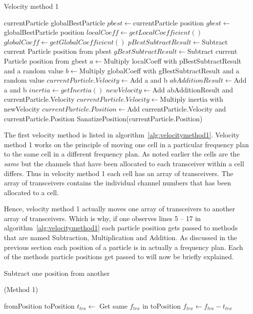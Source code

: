 \begin{algorithm}
\caption{Velocity method 1}
\label{alg:velocitymethod1}
	\begin{algorithmic}[1]
	\REQUIRE currentParticle
	\REQUIRE globalBestParticle
	\STATE $pbest \leftarrow $currentParticle position
	\STATE $gbest \leftarrow $globalBestParticle position
	\STATE $localCoeff \leftarrow getLocalCoefficient()$
	\STATE $globalCoeff \leftarrow getGlobalCoefficient()$
	\STATE $pBestSubtractResult \leftarrow $Subtract current Particle position from pbest
	\STATE $gBestSubtractResult \leftarrow $Subtract current Particle position from gbest
	\STATE $a \leftarrow $Multiply localCoeff with pBestSubtractResult and a random value
	\STATE $b \leftarrow $Multiply globalCoeff with gBestSubtractResult and a random value
		\STATE $currentParticle.Velocity \leftarrow $Add a and b
	\ELSE
		\STATE $abAdditionResult \leftarrow $Add a and b
		\STATE $inertia \leftarrow getInertia()$
		\STATE $newVelocity \leftarrow $Add abAdditionResult and currentParticle.Velocity
		\STATE $currentParticle.Velocity \leftarrow $Multiply inertia with newVelocity
	\ENDIF
	\STATE $currentParticle.Position \leftarrow $Add currentParticle.Velocity and currentParticle.Position
	\STATE SanatizePosition(currentParticle.Position)
	\end{algorithmic}
\end{algorithm}

The first velocity method is listed in algorithm~\ref{alg:velocitymethod1}. Velocity method 1 works on the principle of moving one cell in a particular frequency plan to the same cell in a different frequency plan. As noted earlier the cells are the \emph{same} but the channels that have been allocated to each transceiver within a cell differs. Thus in velocity method 1 each cell has an array of transceivers. The array of transceivers contains the individual channel numbers that has been allocated to a cell.

Hence, velocity method 1 actually moves one array of transceivers to another array of transceivers. Which is why, if one observes lines 5 -- 17 in algorithm~\ref{alg:velocitymethod1} each particle position gets passed to methods that are named Subtraction, Multiplication and Addition. As discussed in the previous section each position of a particle is in actually a frequency plan. Each of the methods particle positions get passed to will now be briefly explained.

\begin{algorithm}
\caption{Subtract one position from another} (Method 1)
\label{alg:arraySubtract}
\begin{algorithmic}[1]
	\REQUIRE fromPosition
	\REQUIRE toPosition
			\STATE $t_{trx} \leftarrow$ Get same $f_{trx}$ in toPosition
			\STATE $f_{trx} \leftarrow f_{trx} - t_{trx}$
		\ENDFOR
	\ENDFOR
\end{algorithmic}
\end{algorithm}


